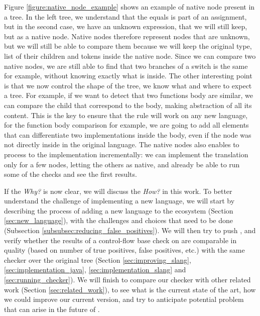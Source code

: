 Figure \ref{figure:native_node_example} shows an example of native node present in a \slang{} tree. In the left tree, we understand that the equals is part of an assignment, but in the second case, we have an unknown expression, that we will still keep, but as a native node.
Native nodes therefore represent nodes that are unknown, but we will still be able to compare them because we will keep the original type, list of their children and tokens inside the native node. 
Since we can compare two native nodes, we are still able to find that two branches of a switch is the same for example, without knowing exactly what is inside. 
The other interesting point is that we now control the shape of the tree, we know what and where to expect a tree. 
For example, if we want to detect that two functions body are similar, we can compare the child that correspond to the body, making abstraction of all its content.
This is the key to ensure that the rule will work on any new language, for the function body comparison for example, we are going to add all elements that can differentiate two implementations inside the body, even if the node was not directly inside in the original language.
The native nodes also enables to process to the implementation incrementally: we can implement the translation only for a few nodes, letting the others as native, and already be able to run some of the checks and see the first results.


If the \emph{Why?} is now clear, we will discuss the \emph{How?} in this work. 
To better understand the challenge of implementing a new language, we will start by describing the process of adding a new language to the ecosystem (Section \ref{sec:new_language}), with the challenges and choices that need to be done (Subsection \ref{subsubsec:reducing_false_positives}). 
We will then try to push \slang{}, and verify whether the results of a control-flow base check on \slang{} are comparable in quality (based on number of true positives, false positives, etc.) with the same checker over the original tree (Section \ref{sec:improving_slang}, \ref{sec:implementation_java}, \ref{sec:implementation_slang} and \ref{sec:running_checker}).
We will finish to compare our checker with other related work (Section \ref{sec:related_work}), to see what is the current state of the art, how we could improve our current version, and try to anticipate potential problem that can arise in the future of \slang{}.





